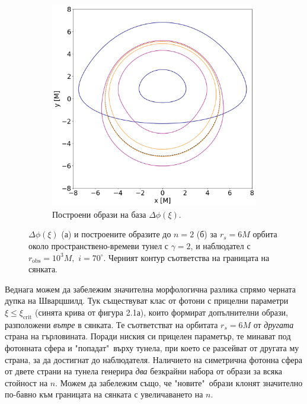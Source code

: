 \documentclass[12pt]{article}
\numberwithin{equation}{section}
\numberwithin{figure}{section}
\begin{document}
\begin{figure}[h]
		\begin{subfigure}{8cm}
			\hspace{-0.25cm}
			\includegraphics[scale = 0.27]{Section_6_Morphology_of_the images_of_horizonless_spacetimes/WH_70_deg_r6_gamma_2.png}
			\caption{Построени образи на база $\Delta\phi(\xi)$.\newline} \label{fig:1b}
		\end{subfigure}
		\caption[$\Delta\phi(\xi)$ и образите за $r_s=6M$ орбита около пространствено-времеви тунел до $n = 2$.]{\small $\Delta\phi(\xi)$ (а) и построените образите до $n = 2$ (б) за $r_s=6M$ орбита около пространствено-времеви тунел с $\gamma = 2$, и наблюдател с $r_\text{obs} = 10^3M,\,\,i = 70^\circ$. Черният контур съответства на границата на сянката.} 
		\label{WH_r6_orbit}
	\end{figure}
	
	Веднага можем да забележим значителна морфологична разлика спрямо черната дупка на Шварцшилд. Тук съществуват клас от фотони с прицелни параметри $\xi \le \xi_\text{crit}$ (синята крива от фигура 2.1а), които формират допълнителни образи, разположени \emph{вътре} в сянката. Те съответстват на орбитата $r_s = 6M$ от \emph{другата} страна на гърловината. Поради ниския си прицелен параметър, те минават под фотонната сфера и "попадат"$\,$ върху тунела, при което се разсейват от другата му страна, за да достигнат до наблюдателя. Наличието на симетрична фотонна сфера от двете страни на тунела генерира \emph{два} безкрайни набора от образи за всяка стойност на $n$. Можем да забележим също, че "новите"$\,$ образи клонят значително по-бавно към границата на сянката с увеличаването на $n$.\\
	
\end{document}
